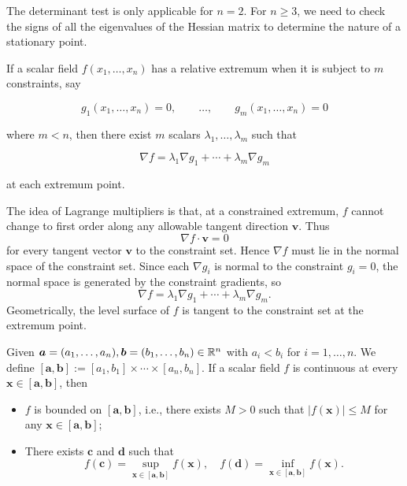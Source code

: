     \begin{remarkenv}
        The determinant test is only applicable for $n=2$. For $n\ge 3$, we need to check the signs of all the eigenvalues of the Hessian matrix to determine the nature of a stationary point.
    \end{remarkenv}
    \begin{methodenv}
        If a scalar field \(f(x_1,\ldots,x_n)\) has a relative extremum when it is subject to \(m\) constraints, say

        \[
        g_1(x_1,\ldots,x_n)=0,\qquad \ldots,\qquad g_m(x_1,\ldots,x_n)=0
        \]

        where \(m<n\), then there exist \(m\) scalars \(\lambda_1,\ldots,\lambda_m\) such that

        \[
        \nabla f=\lambda_1\nabla g_1+\cdots+\lambda_m\nabla g_m
        \]

        at each extremum point.
    \end{methodenv}
    \begin{remarkenv}
        The idea of Lagrange multipliers is that, at a constrained extremum, \(f\) cannot change to first order along any allowable tangent direction \(\mathbf v\). Thus
        \[
        \nabla f\cdot \mathbf v=0
        \]
        for every tangent vector \(\mathbf v\) to the constraint set. Hence \(\nabla f\) must lie in the normal space of the constraint set. Since each \(\nabla g_i\) is normal to the constraint \(g_i=0\), the normal space is generated by the constraint gradients, so
        \[
        \nabla f=\lambda_1\nabla g_1+\cdots+\lambda_m\nabla g_m.
        \]
        Geometrically, the level surface of \(f\) is tangent to the constraint set at the extremum point.
    \end{remarkenv}
    \begin{theoremenv}
        Given $\bm a = (a_1, \ldots, a_n), \bm b = (b_1, \ldots, b_n) \in \mathbb{R}^n$ with $a_i < b_i$ for $i=1, \ldots, n$. We define $\left[ \bm a, \bm b \right] := [a_1, b_1] \times \cdots \times [a_n, b_n]$. If a scalar field $f$ is continuous at every $\bm x \in [\bm a, \bm b]$, then
        \begin{itemize}
            \item $f$ is bounded on $[\bm a, \bm b]$, i.e., there exists $M>0$ such that $|f(\bm x)| \le M$ for any $\bm x \in [\bm a, \bm b]$;
            \item There exists $\bm c$ and $\bm d$ such that
            $$ f(\bm c) = \sup_{\bm x \in [\bm a, \bm b]} f(\bm x),\quad f(\bm d) = \inf_{\bm x \in [\bm a, \bm b]} f(\bm x). $$
        \end{itemize}
    \end{theoremenv}
